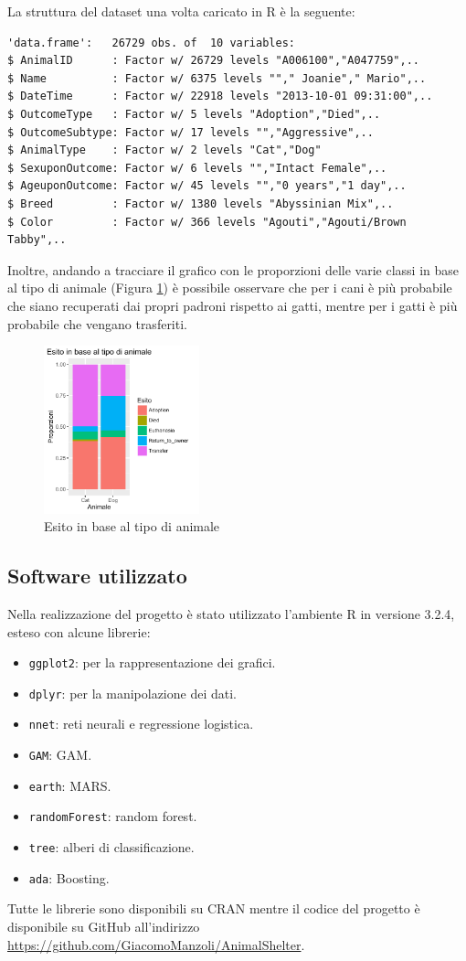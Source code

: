 La struttura del dataset una volta caricato in R è la seguente:

\begin{verbatim}
'data.frame':	26729 obs. of  10 variables:
$ AnimalID      : Factor w/ 26729 levels "A006100","A047759",..
$ Name          : Factor w/ 6375 levels ""," Joanie"," Mario",..
$ DateTime      : Factor w/ 22918 levels "2013-10-01 09:31:00",..
$ OutcomeType   : Factor w/ 5 levels "Adoption","Died",..
$ OutcomeSubtype: Factor w/ 17 levels "","Aggressive",..
$ AnimalType    : Factor w/ 2 levels "Cat","Dog"
$ SexuponOutcome: Factor w/ 6 levels "","Intact Female",..
$ AgeuponOutcome: Factor w/ 45 levels "","0 years","1 day",..
$ Breed         : Factor w/ 1380 levels "Abyssinian Mix",..
$ Color         : Factor w/ 366 levels "Agouti","Agouti/Brown Tabby",..
\end{verbatim}

Inoltre, andando a tracciare il grafico con le proporzioni delle varie classi in base al tipo di animale (Figura \ref{fig-animals}) è possibile osservare che per i cani è più probabile che siano recuperati dai propri padroni rispetto ai gatti, mentre per i gatti è più probabile che vengano trasferiti.

\begin{figure}[htbp]
	\centering
	\includegraphics[width=0.4\textwidth]{./grafici/esito_animal.pdf}
	\caption{Esito in base al tipo di animale}\label{fig-animals}
\end{figure}

\subsection{Software utilizzato}

Nella realizzazione del progetto è stato utilizzato l'ambiente R in versione 3.2.4, esteso con alcune librerie:

\begin{itemize}
	\item \texttt{ggplot2}: per la rappresentazione dei grafici.
	\item \texttt{dplyr}: per la manipolazione dei dati.
	\item \texttt{nnet}: reti neurali e regressione logistica.
	\item \texttt{GAM}: GAM.
	\item \texttt{earth}: MARS.
	\item \texttt{randomForest}: random forest.
	\item \texttt{tree}: alberi di classificazione.
	\item \texttt{ada}: Boosting.
\end{itemize}

Tutte le librerie sono disponibili su CRAN mentre il codice del progetto è disponibile su GitHub all'indirizzo \url{https://github.com/GiacomoManzoli/AnimalShelter}.

